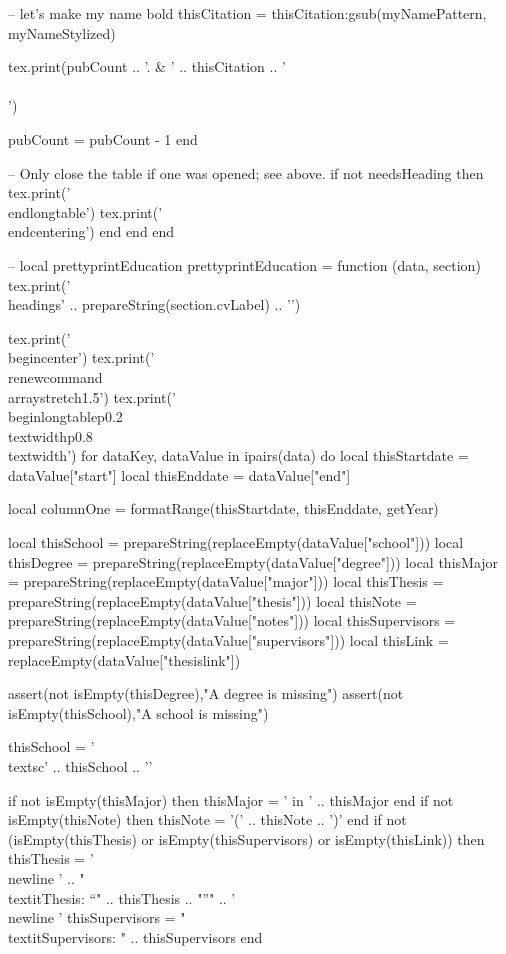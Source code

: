 \documentclass[letterpaper, 10pt]{article}
\newcommand{\headings}[1]{\section*{#1} \hrule \vspace{10pt}}
\begin{document}
\begin{luacode}
				-- let's make my name bold
				thisCitation = thisCitation:gsub(myNamePattern, myNameStylized)

				tex.print(pubCount .. '. & ' .. thisCitation .. '\\\\')

				pubCount = pubCount - 1
			end

			-- Only close the table if one was opened; see above.
			if not needsHeading then
				tex.print('\\end{longtable}')
				tex.print('\\end{centering}')
			end
		end
	end

	-- local prettyprintEducation
	prettyprintEducation = function (data, section)
		tex.print('\\headings{' .. prepareString(section.cvLabel) .. '}')

		tex.print('\\begin{center}')
		tex.print('\\renewcommand{\\arraystretch}{1.5}')
		tex.print('\\begin{longtable}{p{0.2\\textwidth}p{0.8\\textwidth}}')
		for dataKey, dataValue in ipairs(data) do
			local thisStartdate = dataValue["start"]
			local thisEnddate   = dataValue["end"]

			local columnOne = formatRange(thisStartdate, thisEnddate, getYear)

			local thisSchool    	= prepareString(replaceEmpty(dataValue["school"]))
			local thisDegree    	= prepareString(replaceEmpty(dataValue["degree"]))
			local thisMajor    		= prepareString(replaceEmpty(dataValue["major"]))
			local thisThesis 		= prepareString(replaceEmpty(dataValue["thesis"]))
			local thisNote 			= prepareString(replaceEmpty(dataValue["notes"]))
			local thisSupervisors 	= prepareString(replaceEmpty(dataValue["supervisors"]))
			local thisLink 			= replaceEmpty(dataValue["thesislink"])

			assert(not isEmpty(thisDegree),"A degree is missing")
			assert(not isEmpty(thisSchool),"A school is missing")

			thisSchool = '\\textsc{' .. thisSchool .. '}'

			if not isEmpty(thisMajor) then
				thisMajor = ' in ' .. thisMajor
			end
			if not isEmpty(thisNote) then
				thisNote = '(' .. thisNote .. ')'
			end
			if not (isEmpty(thisThesis) or isEmpty(thisSupervisors) or isEmpty(thisLink)) then
				thisThesis = '\\newline ' .. "\\textit{Thesis}: ``" .. thisThesis .. "''" .. '\\newline '
				thisSupervisors = "\\textit{Supervisors}: " .. thisSupervisors
			end


\end{luacode}
\end{document}
